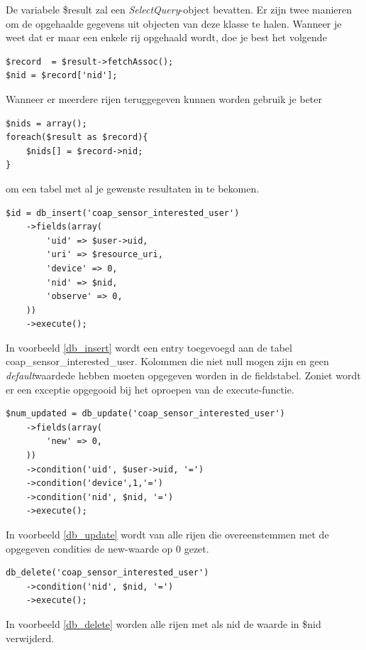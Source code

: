 De variabele \$result zal een \textit{SelectQuery}-object bevatten. Er zijn twee manieren om de opgehaalde gegevens uit objecten van deze klasse te halen. Wanneer je weet dat er maar een enkele rij opgehaald wordt, doe je best het volgende
\lstset{language=PHP}
\begin{lstlisting}
$record  = $result->fetchAssoc();
$nid = $record['nid'];
\end{lstlisting} 
Wanneer er meerdere rijen teruggegeven kunnen worden gebruik je beter
\lstset{language=PHP}
\begin{lstlisting}
$nids = array();
foreach($result as $record){
	$nids[] = $record->nid;
}
\end{lstlisting} 
om een tabel met al je gewenste resultaten in te bekomen. %
\lstset{language=PHP}
\begin{lstlisting}[label=db_insert,caption=Voorbeeld gebruik van db\_insert]
$id = db_insert('coap_sensor_interested_user')
	->fields(array(
		'uid' => $user->uid,
		'uri' => $resource_uri,
		'device' => 0,
		'nid' => $nid,
		'observe' => 0,
	))
	->execute();
\end{lstlisting}
In voorbeeld \ref{db_insert} wordt een entry toegevoegd aan de tabel coap\_sensor\_interested\_user. Kolommen die niet null mogen zijn en geen \textit{default}waardede hebben moeten opgegeven worden in de fieldstabel. Zoniet wordt er een exceptie opgegooid bij het oproepen van de execute-functie.

\lstset{language=PHP}
\begin{lstlisting}[label=db_update,caption=Voorbeeld gebruik van db\_update]
$num_updated = db_update('coap_sensor_interested_user')
	->fields(array(
		'new' => 0,
	))
	->condition('uid', $user->uid, '=')
	->condition('device',1,'=')
	->condition('nid', $nid, '=')
	->execute();
\end{lstlisting}
In voorbeeld \ref{db_update} wordt van alle rijen die overeenstemmen met de opgegeven condities de new-waarde op 0 gezet. %

\lstset{language=PHP}
\begin{lstlisting}[label=db_delete,caption=Voorbeeld gebruik van db\_delete]
db_delete('coap_sensor_interested_user')
	->condition('nid', $nid, '=')
	->execute();
\end{lstlisting}
In voorbeeld \ref{db_delete} worden alle rijen met als nid de waarde in \$nid verwijderd. %


